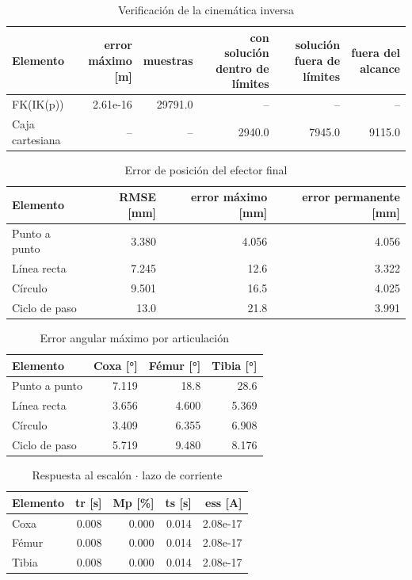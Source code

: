 
\begin{table}[htbp]
\centering
\caption{Verificación de la cinemática inversa}
\begin{tabular}{lrrrrr}
\toprule
Elemento & error máximo [m] & muestras & con solución dentro de límites & solución fuera de límites & fuera del alcance \\
\midrule
FK(IK(p)) & 2.61e-16 & 29791.0 & -- & -- & -- \\
Caja cartesiana & -- & -- & 2940.0 & 7945.0 & 9115.0 \\
\bottomrule
\end{tabular}
\end{table}

\begin{table}[htbp]
\centering
\caption{Error de posición del efector final}
\begin{tabular}{lrrr}
\toprule
Elemento & RMSE [mm] & error máximo [mm] & error permanente [mm] \\
\midrule
Punto a punto & 3.380 & 4.056 & 4.056 \\
Línea recta & 7.245 & 12.6 & 3.322 \\
Círculo & 9.501 & 16.5 & 4.025 \\
Ciclo de paso & 13.0 & 21.8 & 3.991 \\
\bottomrule
\end{tabular}
\end{table}

\begin{table}[htbp]
\centering
\caption{Error angular máximo por articulación}
\begin{tabular}{lrrr}
\toprule
Elemento & Coxa [°] & Fémur [°] & Tibia [°] \\
\midrule
Punto a punto & 7.119 & 18.8 & 28.6 \\
Línea recta & 3.656 & 4.600 & 5.369 \\
Círculo & 3.409 & 6.355 & 6.908 \\
Ciclo de paso & 5.719 & 9.480 & 8.176 \\
\bottomrule
\end{tabular}
\end{table}

\begin{table}[htbp]
\centering
\caption{Respuesta al escalón $\cdot$ lazo de corriente}
\begin{tabular}{lrrrr}
\toprule
Elemento & tr [s] & Mp [\%] & ts [s] & ess [A] \\
\midrule
Coxa & 0.008 & 0.000 & 0.014 & 2.08e-17 \\
Fémur & 0.008 & 0.000 & 0.014 & 2.08e-17 \\
Tibia & 0.008 & 0.000 & 0.014 & 2.08e-17 \\
\bottomrule
\end{tabular}
\end{table}

